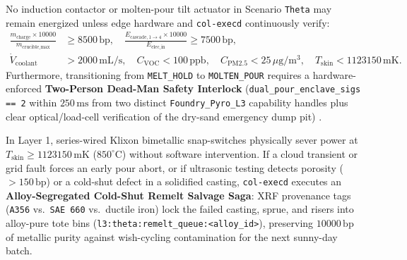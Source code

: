 \begin{invariant}
\label{inv:theta-safety}
No induction contactor or molten-pour tilt actuator in Scenario \texttt{Theta} may remain energized unless edge hardware and \texttt{col-execd}
continuously verify:
\begin{align}
\frac{m_{\mathrm{charge}} \times 10000}{m_{\mathrm{crucible\_max}}} &\ge 8500\,\mathrm{bp}, \quad \frac{E_{\mathrm{cascade},1\to 4} \times 10000}{E_{\mathrm{elec\_in}}} \ge 7500\,\mathrm{bp}, \\
\dot{V}_{\mathrm{coolant}} &> 2000\,\mathrm{mL/s}, \quad C_{\mathrm{VOC}} < 100\,\mathrm{ppb}, \quad C_{\mathrm{PM2.5}} < 25\,\mu\mathrm{g/m^3}, \quad T_{\mathrm{skin}} < 1123150\,\mathrm{mK}.
\end{align}
Furthermore, transitioning from \texttt{MELT\_HOLD} to \texttt{MOLTEN\_POUR} requires a hardware-enforced \textbf{Two-Person Dead-Man Safety
Interlock} (\texttt{dual\_pour\_enclave\_sigs == 2} within $250\,\mathrm{ms}$ from two distinct \texttt{Foundry\_Pyro\_L3} capability handles
plus clear optical/load-cell verification of the dry-sand emergency dump pit) \parencite{iec61508}.
\end{invariant}

In Layer 1, series-wired Klixon bimetallic snap-switches physically sever power at $T_{\mathrm{skin}} \ge 1123150\,\mathrm{mK}$
($850^\circ\mathrm{C}$) without software intervention. If a cloud transient or grid fault forces an early pour abort, or if ultrasonic testing
detects porosity ($> 150\,\mathrm{bp}$) or a cold-shut defect in a solidified casting, \texttt{col-execd} executes an \textbf{Alloy-Segregated
Cold-Shut Remelt Salvage Saga}: XRF provenance tags (\texttt{A356} vs.\ \texttt{SAE 660} vs.\ ductile iron) lock the failed casting, sprue, and
risers into alloy-pure tote bins (\texttt{l3:theta:remelt\_queue:<alloy\_id>}), preserving $10000\,\mathrm{bp}$ of metallic purity against
wish-cycling contamination for the next sunny-day batch.

